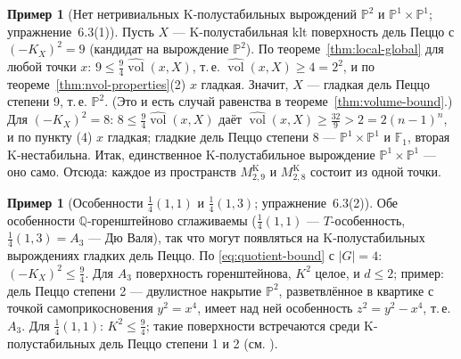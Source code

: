 \documentclass[11pt,a4paper]{article}
\theoremstyle{plain}
\theoremstyle{definition}
\newtheorem{example}[theorem]{Пример}
\theoremstyle{remark}
\newcommand{\Q}{\mathbb{Q}}
\newcommand{\PP}{\mathbb{P}}
\DeclareMathOperator{\vol}{vol}
\newcommand{\hvol}{\widehat{\vol}}
\begin{document}
\begin{example}[Нет нетривиальных K-полустабильных вырождений $\PP^2$ и $\PP^1\times\PP^1$; упражнение~6.3(1)]
Пусть $X$ --- K-полустабильная klt поверхность дель Пеццо с $(-K_X)^2=9$ (кандидат на вырождение
$\PP^2$). По теореме~\ref{thm:local-global} для любой точки $x$: $9\le\frac94\hvol(x,X)$, т.\,е.
$\hvol(x,X)\ge4=2^2$, и по теореме~\ref{thm:nvol-properties}(2) $x$ гладкая. Значит, $X$ --- гладкая
дель Пеццо степени 9, т.\,е. $\PP^2$. (Это и есть случай равенства в теореме~\ref{thm:volume-bound}.)
Для $(-K_X)^2=8$: $8\le\frac94\hvol(x,X)$ даёт $\hvol(x,X)\ge\frac{32}9>2=2(n-1)^n$, и по
пункту (4) $x$ гладкая; гладкие дель Пеццо степени 8 --- $\PP^1\times\PP^1$ и $\mathbb F_1$, вторая
K-нестабильна. Итак, единственное K-полустабильное вырождение $\PP^1\times\PP^1$ --- оно само.
Отсюда: каждое из пространств $M^{\mathrm K}_{2,9}$ и $M^{\mathrm K}_{2,8}$ состоит из одной точки.
\end{example}

\begin{example}[Особенности $\frac14(1,1)$ и $\frac14(1,3)$; упражнение~6.3(2)]
Обе особенности $\Q$-горенштейново сглаживаемы ($\frac14(1,1)$ --- $T$-особенность,
$\frac14(1,3)=A_3$ --- Дю Валя), так что могут появляться на K-полустабильных вырождениях гладких
дель Пеццо. По \eqref{eq:quotient-bound} с $|G|=4$: $(-K_X)^2\le\frac94$. Для $A_3$ поверхность
горенштейнова, $K^2$ целое, и $d\le2$; пример: дель Пеццо степени 2 --- двулистное накрытие
$\PP^2$, разветвлённое в квартике с точкой самоприкосновения $y^2=x^4$, имеет над ней особенность
$z^2=y^2-x^4$, т.\,е. $A_3$. Для $\frac14(1,1)$: $K^2\le\frac94$; такие поверхности встречаются
среди K-полустабильных дель Пеццо степени 1 и 2 (см. \cite{OSS}).
\end{example}
\end{document}
